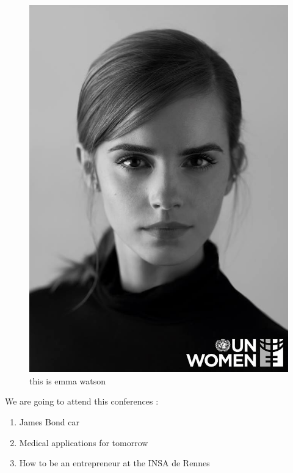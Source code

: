 \documentclass[12pt]{article}
\begin{document}
\begin{figure}[t]
\centerline{\includegraphics[scale=0.35]{picture}}
   \caption{\label{étiquette} this is emma watson}
\end{figure}
\newpage


We are going to attend this conferences :
\begin{enumerate}
\item James Bond car
\item Medical applications for tomorrow
\item How to be an entrepreneur at the INSA de Rennes
\end{enumerate}
\end{document}
